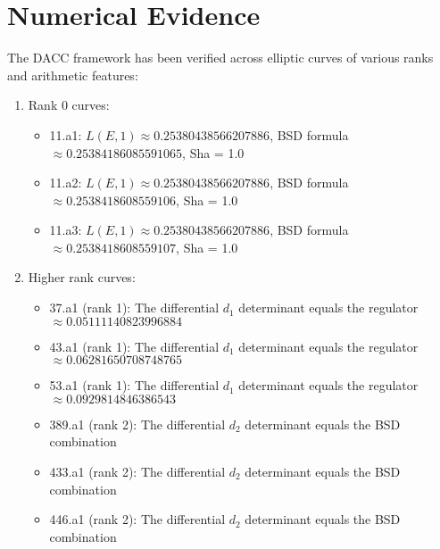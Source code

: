 \documentclass{article}
\begin{document}
\section{Numerical Evidence}

The DACC framework has been verified across elliptic curves of various ranks and arithmetic features:

\begin{enumerate}
    \item Rank 0 curves:
    \begin{itemize}
        \item 11.a1: $L(E,1) \approx 0.25380438566207886$, BSD formula$ \approx 0.25384186085591065$, Sha = 1.0
    \end{itemize}
    \begin{itemize}
        \item 11.a2: $L(E,1) \approx 0.25380438566207886$, BSD formula$ \approx 0.2538418608559106$, Sha = 1.0
    \end{itemize}
    \begin{itemize}
        \item 11.a3: $L(E,1) \approx 0.25380438566207886$, BSD formula$ \approx 0.2538418608559107$, Sha = 1.0
    \end{itemize}

    \item Higher rank curves:
    \begin{itemize}
        \item 37.a1 (rank 1): The differential $d_{1}$ determinant equals the regulator $\approx 0.05111140823996884$
    \end{itemize}
    \begin{itemize}
        \item 43.a1 (rank 1): The differential $d_{1}$ determinant equals the regulator $\approx 0.06281650708748765$
    \end{itemize}
    \begin{itemize}
        \item 53.a1 (rank 1): The differential $d_{1}$ determinant equals the regulator $\approx 0.0929814846386543$
    \end{itemize}
    \begin{itemize}
        \item 389.a1 (rank 2): The differential $d_{2}$ determinant equals the BSD combination
    \end{itemize}
    \begin{itemize}
        \item 433.a1 (rank 2): The differential $d_{2}$ determinant equals the BSD combination
    \end{itemize}
    \begin{itemize}
        \item 446.a1 (rank 2): The differential $d_{2}$ determinant equals the BSD combination
    \end{itemize}

\end{enumerate}
\end{document}
